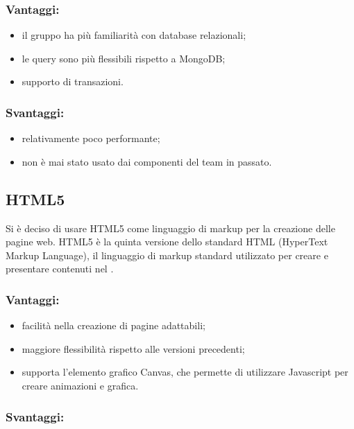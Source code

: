 \documentclass[a4paper, titlepage]{article}
\begin{document}
\subsubsection{Vantaggi:}

\begin{itemize}
	\item il gruppo ha più familiarità con database relazionali;
	\item le query sono più flessibili rispetto a MongoDB;
	\item supporto di transazioni.
\end{itemize}

\subsubsection{Svantaggi:}

\begin{itemize}
	\item relativamente poco performante;
	\item non è mai stato usato dai componenti del team in passato.
\end{itemize}

\subsection{HTML5}
Si è deciso di usare HTML5 come linguaggio di markup per la creazione delle pagine web. HTML5 è la quinta versione dello standard HTML (HyperText Markup Language), il linguaggio di markup standard utilizzato per creare e presentare contenuti nel .

\subsubsection{Vantaggi:}

\begin{itemize}
	\item facilità nella creazione di pagine adattabili;
	\item maggiore flessibilità rispetto alle versioni precedenti;
	\item supporta l'elemento grafico Canvas, che permette di utilizzare Javascript per creare animazioni e grafica.
\end{itemize}

\subsubsection{Svantaggi:}
\end{document}
